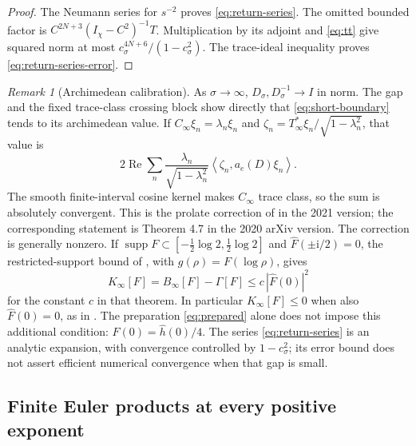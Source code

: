\documentclass[11pt]{article}
\numberwithin{equation}{section}
\theoremstyle{definition}
\theoremstyle{remark}
\newtheorem{remark}[theorem]{Remark}
\newcommand{\Rea}{\operatorname{Re}}
\newcommand{\ii}{\mathrm i}
\newcommand{\Id}{I}
\newcommand{\inner}[2]{\left\langle #1,#2\right\rangle}
\begin{document}
\begin{proof}
The Neumann series for \(s^{-2}\) proves
\eqref{eq:return-series}. The omitted bounded factor is
\(C^{2N+3}(\Id_\chi-C^2)^{-1}T\).
Multiplication by its adjoint and \eqref{eq:tt} give squared norm
at most \(c_\sigma^{4N+6}/(1-c_\sigma^2)\).
The trace-ideal inequality proves \eqref{eq:return-series-error}.
\end{proof}

\begin{remark}[Archimedean calibration]\label{rem:calibration}
As \(\sigma\to\infty\), \(D_\sigma,D_\sigma^{-1}\to\Id\) in norm.
The gap and the fixed trace-class crossing block show directly that
\eqref{eq:short-boundary} tends to its archimedean value.
If \(C_\infty\xi_n=\lambda_n\xi_n\) and
\(\zeta_n=T_\infty^*\xi_n/\sqrt{1-\lambda_n^2}\), that value is
\[
2\Rea\sum_n\frac{\lambda_n}{\sqrt{1-\lambda_n^2}}
\inner{\zeta_n}{a_e(D)\xi_n}.
\]
The smooth finite-interval cosine kernel makes \(C_\infty\) trace
class, so the sum is absolutely convergent.
This is the prolate correction of
\cite[Theorem 4.6]{CCWeil} in the 2021 version; the corresponding
statement is Theorem 4.7 in the 2020 arXiv version.
The correction is generally nonzero. If
\(\operatorname{supp}F\subset[-\tfrac12\log2,\tfrac12\log2]\)
and \(\widehat F(\pm\ii/2)=0\), the restricted-support bound of
\cite[Theorem 6.11]{CCWeil}, with \(g(\rho)=F(\log\rho)\), gives
\[
K_\infty[F]=B_\infty[F]-\Gamma[F]
\le c\,|\widehat F(0)|^2
\]
for the constant \(c\) in that theorem. In particular
\(K_\infty[F]\le0\) when also \(\widehat F(0)=0\), as in
\cite[Theorem 1]{CCWeil}. The preparation \eqref{eq:prepared}
alone does not impose this additional condition:
\(\widehat F(0)=\widehat h(0)/4\).
The series \eqref{eq:return-series} is an analytic expansion, with
convergence controlled by \(1-c_\sigma^2\); its error bound does not
assert efficient numerical convergence when that gap is small.
\end{remark}

\subsection{Finite Euler products at every positive exponent}
\label{sec:finite-euler}
\end{document}

